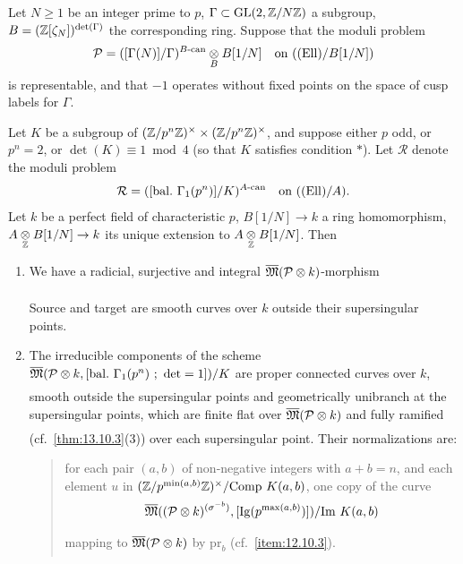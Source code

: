 \begin{kthm}\label{thm:13.12.3}
Let $N \ge 1$ be an integer prime to $p$, $\Gamma \subset \operatorname{GL}(2, \mathbb{Z}/N\mathbb{Z})$ a subgroup, $B = (\mathbb{Z}[\zeta_N])^{\det(\Gamma)}$ the corresponding ring. Suppose that the moduli problem
\[
\mathcal{P} = ([\Gamma(N)]/\Gamma)^{B\text{-}\mathrm{can}} \underset{B}{\otimes} B[1/N] \quad\text{on } ((\mathrm{Ell})/B[1/N])
\]
is representable, and that $-1$ operates without fixed points on the space of cusp labels for $\Gamma$.
\par
Let $K$ be a subgroup of $(\mathbb{Z}/p^n\mathbb{Z})^\times \times (\mathbb{Z}/p^n\mathbb{Z})^\times$, and suppose either $p$ odd, or $p^n = 2$, or $\det(K) \equiv 1 \bmod 4$ (so that $K$ satisfies condition $*$). Let $\mathcal{R}$ denote the moduli problem
\[
\mathcal{R} = ([\mathrm{bal.\ }\Gamma_1(p^n)]/K)^{A\text{-}\mathrm{can}} \quad\text{on } ((\mathrm{Ell})/A) .
\]
Let $k$ be a perfect field of characteristic $p$, $B[1/N] \to k$ a ring homomorphism, $A \underset{\mathbb{Z}}{\otimes} B[1/N] \to k$ its unique extension to $A \underset{\mathbb{Z}}{\otimes} B[1/N]$. Then
\begin{enumerate}[(1)]
\item We have a radicial, surjective and integral $\overline{\mathfrak{M}}(\mathcal{P} \underset{}{\otimes} k)$-morphism
\begin{center}
\end{center}
Source and target are smooth curves over $k$ outside their supersingular points.
\item The irreducible components of the scheme $\overline{\mathfrak{M}}(\mathcal{P} \underset{}{\otimes} k,\allowbreak [\mathrm{bal.\ }\Gamma_1(p^n)\ ;\ \det = 1])/K$ are proper connected curves over $k$, smooth outside the supersingular points and geometrically unibranch at the supersingular points, which are finite flat over $\overline{\mathfrak{M}}(\mathcal{P} \underset{}{\otimes} k)$ and fully ramified (cf.\ \ref{thm:13.10.3}(3)) over each supersingular point. Their normalizations are:
\begin{quote}
for each pair $(a,b)$ of non-negative integers with $a+b = n$, and each element $u$ in $(\mathbb{Z}/p^{\min(a,b)}\mathbb{Z})^\times /\allowbreak \mathrm{Comp}\ K(a,b)$, one copy of the curve
\[
\overline{\mathfrak{M}}((\mathcal{P} \tens{} k)^{(\sigma^{-b})}, [\mathrm{Ig}(p^{\max(a,b)})])/\mathrm{Im}\ K(a,b)
\]
mapping to $\overline{\mathfrak{M}}(\mathcal{P} \underset{}{\otimes} k)$ by $\mathrm{pr}_b$ (cf.\ \ref{item:12.10.3}).
\end{quote}
\end{enumerate}
\end{kthm}

